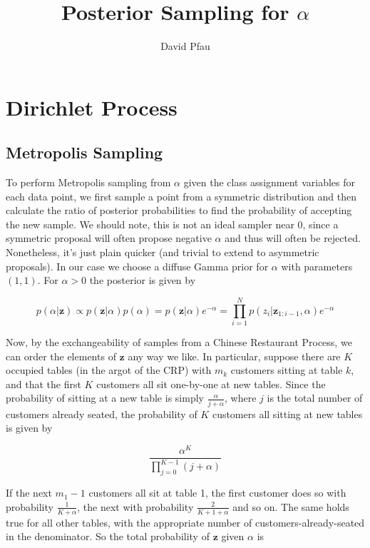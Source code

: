 \documentclass[11pt]{article}
\title{Posterior Sampling for $\alpha$}
\author{David Pfau}
\begin{document}
\maketitle

\section{Dirichlet Process}
\subsection{Metropolis Sampling}

To perform Metropolis sampling from $\alpha$ given the class assignment variables for each data point, we first sample a point from a symmetric distribution and then calculate the ratio of posterior probabilities to find the probability of accepting the new sample.  We should note, this is not an ideal sampler near $0$, since a symmetric proposal will often propose negative $\alpha$ and thus will often be rejected.  Nonetheless, it's just plain quicker (and trivial to extend to asymmetric proposals).  In our case we choose a diffuse Gamma prior for $\alpha$ with parameters $(1,1)$.  For $\alpha > 0$ the posterior is given by

\begin{equation}
p(\alpha|\textbf{z}) \propto p(\textbf{z}|\alpha) p(\alpha) = p(\textbf{z}|\alpha) e^{-\alpha} = \prod_{i = 1}^{N} p(z_{i}|\textbf{z}_{1:i-1},\alpha) e^{-\alpha}
\end{equation}

Now, by the exchangeability of samples from a Chinese Restaurant Process, we can order the elements of $\textbf{z}$ any way we like.  In particular, suppose there are $K$ occupied tables (in the argot of the CRP) with $m_k$ customers sitting at table $k$, and that the first $K$ customers all sit one-by-one at new tables.  Since the probability of sitting at a new table is simply $\frac{\alpha}{j+\alpha}$, where $j$ is the total number of customers already seated, the probability of $K$ customers all sitting at new tables is given by

\begin{equation}
\label{onecustomer}
\frac{\alpha^K}{\prod_{j=0}^{K-1} (j + \alpha)}
\end{equation}

If the next $m_1 - 1$ customers all sit at table 1, the first customer does so with probability $\frac{1}{K+\alpha}$, the next with probability $\frac{2}{K+1+\alpha}$ and so on.  The same holds true for all other tables, with the appropriate number of customers-already-seated in the denominator.  So the total probability of $\textbf{z}$ given $\alpha$ is
\end{document}
